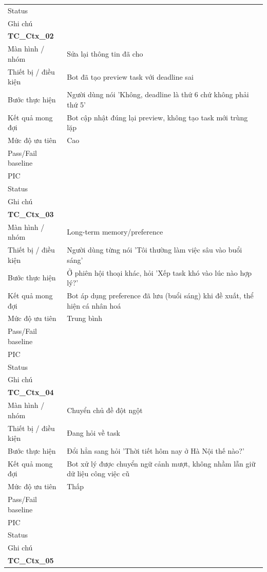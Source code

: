 \documentclass[12pt,a4paper]{article}
\begin{document}
\begin{longtable}{p{3.0cm}p{11.5cm}}
Status &  \\
Ghi chú &  \\
\midrule
\multicolumn{2}{l}{\textbf{TC\_Ctx\_02}} \\
Màn hình / nhóm & Sửa lại thông tin đã cho \\
Thiết bị / điều kiện & Bot đã tạo preview task với deadline sai \\
Bước thực hiện & Người dùng nói 'Không, deadline là thứ 6 chứ không phải thứ 5' \\
Kết quả mong đợi & Bot cập nhật đúng lại preview, không tạo task mới trùng lặp \\
Mức độ ưu tiên & Cao \\
Pass/Fail baseline &  \\
PIC &  \\
Status &  \\
Ghi chú &  \\
\midrule
\multicolumn{2}{l}{\textbf{TC\_Ctx\_03}} \\
Màn hình / nhóm & Long-term memory/preference \\
Thiết bị / điều kiện & Người dùng từng nói 'Tôi thường làm việc sâu vào buổi sáng' \\
Bước thực hiện & Ở phiên hội thoại khác, hỏi 'Xếp task khó vào lúc nào hợp lý?' \\
Kết quả mong đợi & Bot áp dụng preference đã lưu (buổi sáng) khi đề xuất, thể hiện cá nhân hoá \\
Mức độ ưu tiên & Trung bình \\
Pass/Fail baseline &  \\
PIC &  \\
Status &  \\
Ghi chú &  \\
\midrule
\multicolumn{2}{l}{\textbf{TC\_Ctx\_04}} \\
Màn hình / nhóm & Chuyển chủ đề đột ngột \\
Thiết bị / điều kiện & Đang hỏi về task \\
Bước thực hiện & Đổi hẳn sang hỏi 'Thời tiết hôm nay ở Hà Nội thế nào?' \\
Kết quả mong đợi & Bot xử lý được chuyển ngữ cảnh mượt, không nhầm lẫn giữ dữ liệu công việc cũ \\
Mức độ ưu tiên & Thấp \\
Pass/Fail baseline &  \\
PIC &  \\
Status &  \\
Ghi chú &  \\
\midrule
\multicolumn{2}{l}{\textbf{TC\_Ctx\_05}} \\

\end{longtable}
\end{document}
